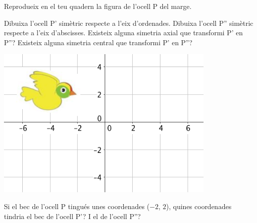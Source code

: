 \begin{mylist}

\vspace{-2.5cm}
\exer \begin{minipage}[t]{0.6\textwidth}
	Reprodueix en el teu quadern la figura de l'ocell P del marge. 
	
	\begin{tasks}
		\task  Dibuixa l'ocell P' simètric respecte a l'eix d'ordenades.
		\task  Dibuixa l'ocell P'' simètric respecte a l'eix d'abscisses. 
		\task  Existeix alguna simetria axial que transformi P' en P''? Existeix alguna simetria central que transformi P' en P''?
	\end{tasks}
\end{minipage}
\begin{minipage}{0.4\textwidth}
	\centering
	\vspace{2.5cm}
	\includegraphics[width=0.8\textwidth]{img-10/ocell}
\end{minipage}

\begin{tasks}[resume=true]
	\task  Si el bec de l'ocell P tingués unes coordenades ($-2$, $2$), quines coordenades tindria el bec de l'ocell P'? I el de l'ocell P''?
\end{tasks}
 
 

\end{mylist}
